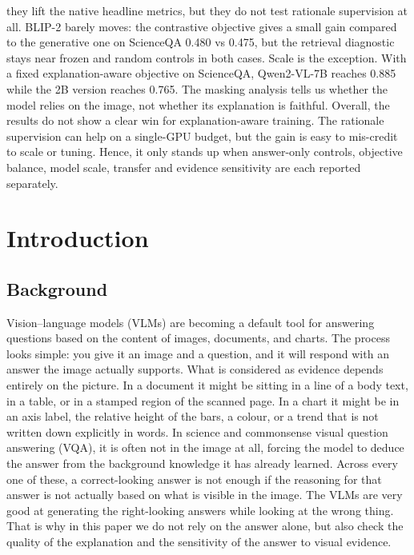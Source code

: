\documentclass[12pt,bibliography=totoc,listof=totoc,BCOR=5mm,DIV=12,oneside,open=any]{scrbook}
\begin{document}
they lift the native headline metrics, but they do not test rationale supervision at all.
BLIP-2 barely moves: the contrastive objective gives a small gain compared to the generative one on ScienceQA 0.480 vs 0.475,
but the retrieval diagnostic stays near frozen and random controls in both cases.
Scale is the exception. With a fixed explanation-aware objective on ScienceQA, Qwen2-VL-7B reaches 0.885 while the 2B version reaches 0.765.
The masking analysis tells us whether the model relies on the image, not whether its explanation is faithful.
Overall, the results do not show a clear win for explanation-aware training.
The rationale supervision can help on a single-GPU budget, but the gain is easy to mis-credit to scale or tuning.
Hence, it only stands up when answer-only controls, objective balance, model scale, transfer and evidence sensitivity are each reported separately.

    \clearpage

    \tableofcontents
    \clearpage

    \listoffigures
    \clearpage

    \listoftables
    \clearpage


\mainmatter %

\chapter{Introduction}
\section{Background}
Vision--language models (VLMs) are becoming a default tool for answering questions based on the content of images, documents, and charts.
The process looks simple: you give it an image and a question, and it will respond with an answer the image actually supports.
What is considered as evidence depends entirely on the picture. 
In a document it might be sitting in a line of a body text, in a table, or in a stamped region of the scanned page.
In a chart it might be in an axis label, the relative height of the bars, a colour, or a trend that is not written down explicitly in words.
In science and commonsense visual question answering (VQA), it is often not in the image at all, forcing the model to deduce the answer from the background knowledge it has already learned.
Across every one of these, a correct-looking answer is not enough if the reasoning for that answer is not actually based on what is visible in the image.
The VLMs are very good at generating the right-looking answers while looking at the wrong thing.
That is why in this paper we do not rely on the answer alone, but also check the quality of the explanation and the sensitivity of the answer to visual evidence.
\end{document}
